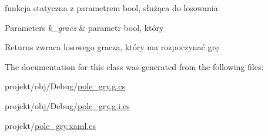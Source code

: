 funkcja statyczna z parametrem bool, służąca do losowania 


\begin{DoxyParams}{Parameters}
{\em k\+\_\+gracz} & parametr bool, który \\
\hline
\end{DoxyParams}
\begin{DoxyReturn}{Returns}
zwraca losowego gracza, który ma rozpoczynać grę 
\end{DoxyReturn}


The documentation for this class was generated from the following files\+:\begin{DoxyCompactItemize}
\item 
projekt/obj/\+Debug/\mbox{\hyperlink{_debug_2pole__gry_8g_8cs}{pole\+\_\+gry.\+g.\+cs}}\item 
projekt/obj/\+Debug/\mbox{\hyperlink{_debug_2pole__gry_8g_8i_8cs}{pole\+\_\+gry.\+g.\+i.\+cs}}\item 
projekt/\mbox{\hyperlink{pole__gry_8xaml_8cs}{pole\+\_\+gry.\+xaml.\+cs}}\end{DoxyCompactItemize}
